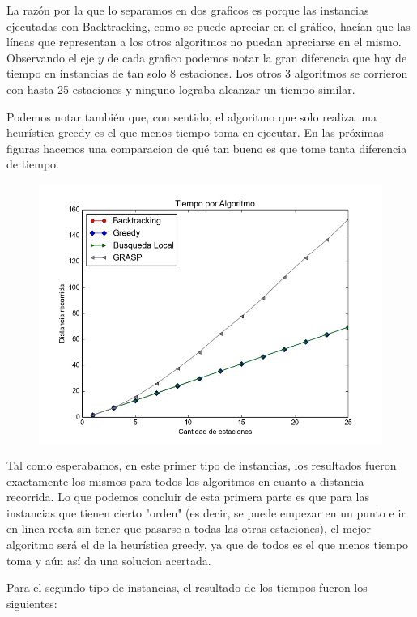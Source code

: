         \blindtext

        La razón por la que lo separamos en dos graficos es porque las instancias ejecutadas con Backtracking, como se puede apreciar en el gráfico, hacían que las líneas que representan a los otros algoritmos no puedan apreciarse en el mismo. Observando el eje $y$ de cada grafico podemos notar la gran diferencia que hay de tiempo en instancias de tan solo 8 estaciones. Los otros 3 algoritmos se corrieron con hasta 25 estaciones y ninguno lograba alcanzar un tiempo similar.

        Podemos notar también que, con sentido, el algoritmo que solo realiza una heurística greedy es el que menos tiempo toma en ejecutar. En las próximas figuras hacemos una comparacion de qué tan bueno es que tome tanta diferencia de tiempo.

        \begin{figure}[H]
            \begin{center}
              \includegraphics[width=0.7\columnwidth]{imagenes/exp1a_ej5_correctitud_solucion.jpeg}
              \caption{}
            \end{center}
        \end{figure}

        Tal como esperabamos, en este primer tipo de instancias, los resultados fueron exactamente los mismos para todos los algoritmos en cuanto a distancia recorrida. Lo que podemos concluir de esta primera parte es que para las instancias que tienen cierto "orden" (es decir, se puede empezar en un punto e ir en linea recta sin tener que pasarse a todas las otras estaciones), el mejor algoritmo será el de la heurística greedy, ya que de todos es el que menos tiempo toma y aún así da una solucion acertada.

        Para el segundo tipo de instancias, el resultado de los tiempos fueron los siguientes:

